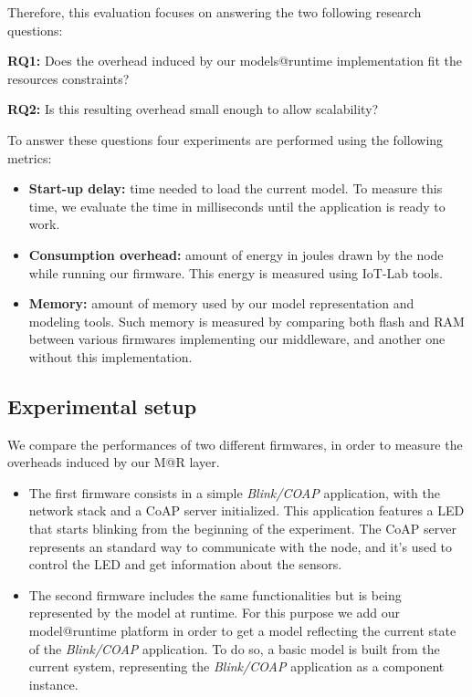 
Therefore, this evaluation focuses on answering the two following research questions:

\textbf{RQ1:} Does the overhead induced by our models@runtime implementation fit the resources constraints?

\textbf{RQ2:} Is this resulting overhead small enough to allow scalability?


To answer these questions four experiments are performed using the following metrics:
\begin{itemize}
	\item \textbf{Start-up delay:} time needed to load the current model. To measure this time, we evaluate the time in milliseconds until the application is ready to work.
	\item \textbf{Consumption overhead:} amount of energy in joules drawn by the node while running our firmware.
	This energy is measured using IoT-Lab tools. 
	\item \textbf{Memory:} amount of memory used by our model representation and modeling tools.
	Such memory is measured by comparing both flash and RAM between various firmwares implementing our middleware, and another one without this implementation.
\end{itemize}

\subsection{Experimental setup}
We compare the performances of two different firmwares, in order to measure the overheads induced by our M@R layer.


\begin{itemize}
	\item The first firmware consists in a simple \emph{Blink/COAP} application, with the network stack and a CoAP server initialized.
	This application features a LED that starts blinking from the beginning of the experiment. The CoAP server represents an standard way to communicate with the node, and it's used to control the LED and get information about the sensors.
	\item The second firmware includes the same functionalities but is being represented by the model at runtime. For this purpose we add our model@runtime platform in order to get a model reflecting the current state of the \emph{Blink/COAP} application.
	To do so, a basic model is built from the current system, representing the \emph{Blink/COAP} application as a component instance.
\end{itemize}

